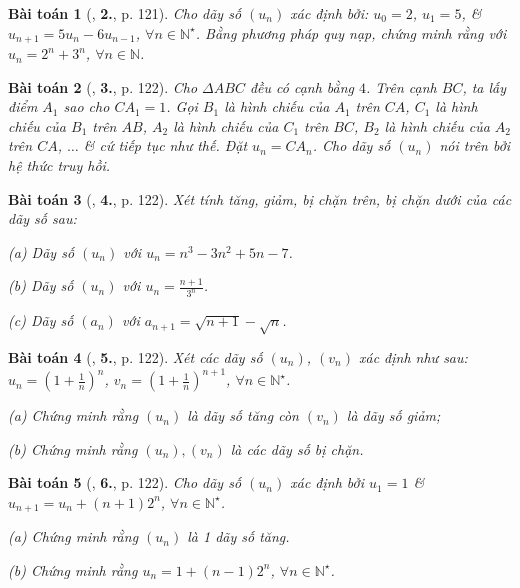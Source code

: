 \documentclass{article}
\numberwithin{equation}{section}
\newtheorem{baitoan}{Bài toán}[section]
\begin{document}
\begin{baitoan}[\cite{TL_chuyen_Toan_Dai_So_Giai_Tich_11}, \textbf{2.}, p. 121]
	Cho dãy số $(u_n)$ xác định bởi: $u_0 = 2$, $u_1 = 5$, \& $u_{n+1} = 5u_n - 6u_{n-1}$, $\forall n\in\mathbb{N}^\star$. Bằng phương pháp quy nạp, chứng minh rằng với $u_n = 2^n + 3^n$, $\forall n\in\mathbb{N}$.
\end{baitoan}

\begin{baitoan}[\cite{TL_chuyen_Toan_Dai_So_Giai_Tich_11}, \textbf{3.}, p. 122]
	Cho $\Delta ABC$ đều có cạnh bằng $4$. Trên cạnh $BC$, ta lấy điểm $A_1$ sao cho $CA_1 = 1$. Gọi $B_1$ là hình chiếu của $A_1$ trên $CA$, $C_1$ là hình chiếu của $B_1$ trên $AB$, $A_2$ là hình chiếu của $C_1$ trên $BC$, $B_2$ là hình chiếu của $A_2$ trên $CA$, $\ldots$ \& cứ tiếp tục như thế. Đặt $u_n = CA_n$. Cho dãy số $(u_n)$ nói trên bởi hệ thức truy hồi.
\end{baitoan}

\begin{baitoan}[\cite{TL_chuyen_Toan_Dai_So_Giai_Tich_11}, \textbf{4.}, p. 122]
	Xét tính tăng, giảm, bị chặn trên, bị chặn dưới của các dãy số sau:
	\begin{enumerate*}
		\item[(a)] Dãy số $(u_n)$ với $u_n = n^3 - 3n^2 + 5n - 7$.
		\item[(b)] Dãy số $(u_n)$ với $u_n = \frac{n + 1}{3^n}$.
		\item[(c)] Dãy số $(a_n)$ với $a_{n+1} = \sqrt{n + 1} - \sqrt{n}$.
	\end{enumerate*}
\end{baitoan}

\begin{baitoan}[\cite{TL_chuyen_Toan_Dai_So_Giai_Tich_11}, \textbf{5.}, p. 122]
	Xét các dãy số $(u_n)$, $(v_n)$ xác định như sau: $u_n = \left(1 + \frac{1}{n}\right)^n$, $v_n = \left(1 + \frac{1}{n}\right)^{n+1}$, $\forall n\in\mathbb{N}^\star$.
	\begin{enumerate*}
		\item[(a)] Chứng minh rằng $(u_n)$ là dãy số tăng còn $(v_n)$ là dãy số giảm;
		\item[(b)] Chứng minh rằng $(u_n),(v_n)$ là các dãy số bị chặn.
	\end{enumerate*}
\end{baitoan}

\begin{baitoan}[\cite{TL_chuyen_Toan_Dai_So_Giai_Tich_11}, \textbf{6.}, p. 122]
	Cho dãy số $(u_n)$ xác định bởi $u_1 = 1$ \& $u_{n+1} = u_n + (n + 1)2^n$, $\forall n\in\mathbb{N}^\star$.
	\begin{enumerate*}
		\item[(a)] Chứng minh rằng $(u_n)$ là 1 dãy số tăng.
		\item[(b)] Chứng minh rằng $u_n = 1 + (n - 1)2^n$, $\forall n\in\mathbb{N}^\star$.
	\end{enumerate*}
\end{baitoan}
\end{document}
